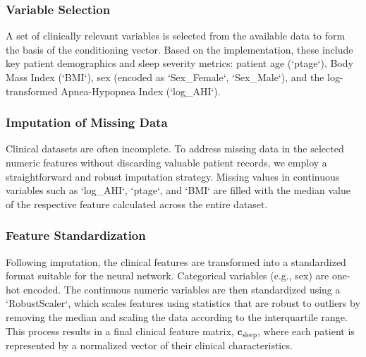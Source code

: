 \documentclass[11pt,en]{elegantpaper}
\begin{document}
\subsubsection{Variable Selection}
A set of clinically relevant variables is selected from the available data to form the basis of the conditioning vector. Based on the implementation, these include key patient demographics and sleep severity metrics: patient age (`ptage`), Body Mass Index (`BMI`), sex (encoded as `Sex_Female`, `Sex_Male`), and the log-transformed Apnea-Hypopnea Index (`log_AHI`).

\subsubsection{Imputation of Missing Data}
Clinical datasets are often incomplete. To address missing data in the selected numeric features without discarding valuable patient records, we employ a straightforward and robust imputation strategy. Missing values in continuous variables such as `log_AHI`, `ptage`, and `BMI` are filled with the median value of the respective feature calculated across the entire dataset.

\subsubsection{Feature Standardization}
Following imputation, the clinical features are transformed into a standardized format suitable for the neural network. Categorical variables (e.g., sex) are one-hot encoded. The continuous numeric variables are then standardized using a `RobustScaler`, which scales features using statistics that are robust to outliers by removing the median and scaling the data according to the interquartile range. This process results in a final clinical feature matrix, $\mathbf{c}_{\text{sleep}}$, where each patient is represented by a normalized vector of their clinical characteristics.
\end{document}
